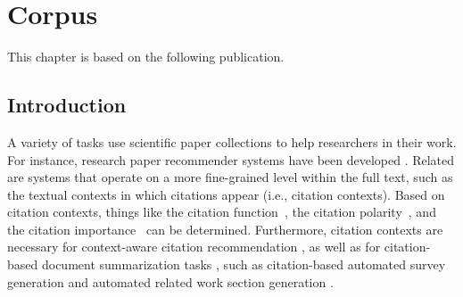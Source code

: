 \chapter{Corpus}

This chapter is based on the following publication.
\begin{quote}
\end{quote}


\section{Introduction}
A variety of tasks use scientific paper collections to help researchers in their work. For instance, research paper recommender systems have been developed \cite{Beel2016fixed}. Related are systems that operate on a more fine-grained level within the full text, such as the textual contexts in which citations appear (i.e., citation contexts). 
Based on citation contexts, things like the citation function~\cite{Teufel2006EMNLP,Teufel2006fixed,Moravcsik1975}, the citation polarity~\cite{GhoshD017,Abu-Jbara2013fixed}, and the citation importance~\cite{Valenzuela2015fixed,Chakraborty2016} can be determined. Furthermore, citation contexts are necessary for context-aware citation recommendation \cite{He2010WWW,Ebensu2017}, as well as for citation-based document summarization tasks \cite{Chandrasekaran2019}, such as citation-based automated survey generation \cite{Mohammad2009} and automated related work section generation \cite{Jinggiang2007}.

